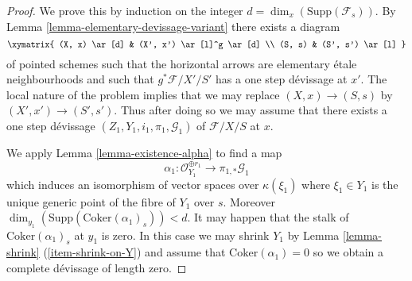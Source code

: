 \begin{proof}
We prove this by induction on the integer
$d = \dim_x(\text{Supp}(\mathcal{F}_s))$.
By
Lemma \ref{lemma-elementary-devissage-variant}
there exists a diagram
$$
\xymatrix{
(X, x) \ar[d] & (X', x') \ar[l]^g \ar[d] \\
(S, s) & (S', s') \ar[l]
}
$$
of pointed schemes such that the horizontal
arrows are elementary \'etale neighbourhoods
and such that $g^*\mathcal{F}/X'/S'$ has a one step d\'evissage at $x'$.
The local nature of the problem implies that we may replace
$(X, x) \to (S, s)$ by $(X', x') \to (S', s')$. Thus after doing so
we may assume that there exists a one step d\'evissage
$(Z_1, Y_1, i_1, \pi_1, \mathcal{G}_1)$ of $\mathcal{F}/X/S$ at $x$.

\medskip\noindent
We apply
Lemma \ref{lemma-existence-alpha}
to find a map
$$
\alpha_1 :
\mathcal{O}_{Y_1}^{\oplus r_1}
\longrightarrow
\pi_{1, *}\mathcal{G}_1
$$
which induces an isomorphism of vector spaces over $\kappa(\xi_1)$
where $\xi_1 \in Y_1$ is the unique generic point of the fibre of
$Y_1$ over $s$. Moreover
$\dim_{y_1}(\text{Supp}(\text{Coker}(\alpha_1)_s)) < d$.
It may happen that the stalk of $\text{Coker}(\alpha_1)_s$
at $y_1$ is zero. In this case we may shrink $Y_1$ by
Lemma \ref{lemma-shrink} (\ref{item-shrink-on-Y})
and assume that $\text{Coker}(\alpha_1) = 0$ so we obtain a
complete d\'evissage of length zero.


\end{proof}
